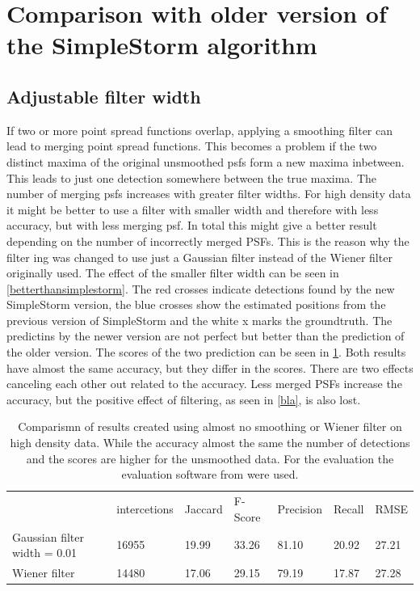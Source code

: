 \section{Comparison with older version of the SimpleStorm algorithm}
\subsection{Adjustable filter width} \label{sectionFilterisEvil}
If two or more point spread functions overlap, applying a smoothing filter can lead to merging point spread functions. This becomes a problem if the two distinct maxima of the original unsmoothed psfs form a new maxima inbetween. This leads to just one detection somewhere between the true maxima. The number of merging psfs increases with greater filter widths. For high density data it might be better to use a filter with smaller width and therefore with less accuracy, but with less merging psf. In total this might give a better result depending on the number of incorrectly merged PSFs. This is the reason why the filter ing was changed to use just a Gaussian filter instead of the Wiener filter originally used. 
The effect of the smaller filter width can be seen in \ref{betterthansimplestorm}. The red crosses indicate detections found by the new SimpleStorm version, the blue crosses show the estimated positions from the previous version of SimpleStorm and the white x marks the groundtruth. The predictins by the newer version are not perfect but better than the prediction of the older version. The scores of the two prediction can be seen in \ref{tabelbetterthansimplestorm}. Both results have almost the same accuracy, but they differ in the scores. There are two effects canceling each other out related to the accuracy. Less merged PSFs increase the accuracy, but the positive effect of filtering, as seen in \ref{bla}, is also lost. 

\begin{table}
\caption{Comparismn of results created using almost no smoothing or Wiener filter on high density data. While the accuracy almost the same the number of detections and the scores are higher for the unsmoothed data. For the evaluation the evaluation software from \cite{challenge} were used.}
\begin{tabular}{lllllll}
&intercetions&Jaccard&F-Score&Precision&Recall&RMSE\\
Gaussian filter width = 0.01& 16955&19.99&33.26&81.10&20.92&27.21\\
Wiener filter& 14480&17.06&29.15&79.19&17.87&27.28
\end{tabular} \label{tabelbetterthansimplestorm}

\end{table}





